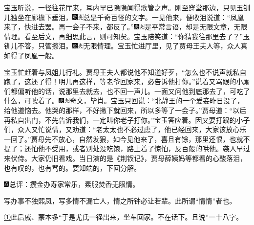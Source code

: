 宝玉听说，一径往花厅来，耳内早已隐隐闻得歌管之声。刚至穿堂那边，只见玉钏儿独坐在廊檐下垂泪，{\includegraphics[width=3mm]{../Images/00004}\includegraphics[width=3mm]{../Images/00012}\footnotesize \kaishu 总是千奇百怪的文字。}一见他来，便收泪说道：``凤凰来了，快进去罢。再一会子不来，都反了。''{\includegraphics[width=3mm]{../Images/00004}\includegraphics[width=3mm]{../Images/00012}\footnotesize \kaishu 是平常言语，却是无限文章，无限情理。看至后文，再细思此言，则可知矣。}宝玉陪笑道：``你猜我往那里去了？''玉钏儿不答，只管擦泪。{\includegraphics[width=3mm]{../Images/00004}\includegraphics[width=3mm]{../Images/00012}\footnotesize \kaishu 无限情理。}宝玉忙进厅里，见了贾母王夫人等，众人真如得了凤凰一般。

宝玉忙赶着与凤姐儿行礼。贾母王夫人都说他不知道好歹，``怎么也不说声就私自跑了，这还了得！明儿再这样，等老爷回家来，必告诉他打你。''说着又骂跟的小厮们都偏听他的话，说那里去就去，也不回一声儿。一面又问他到底那去了，可吃了什么，可唬着了。{\includegraphics[width=3mm]{../Images/00004}\includegraphics[width=3mm]{../Images/00012}\footnotesize \kaishu 奇文，毕肖。}宝玉只回说：``北静王的一个爱妾昨日没了，给他道恼去。他哭的那样，不好撇下就回来，所以多等了一会子。''贾母道：``以后再私自出门，不先告诉我们，一定叫你老子打你。''宝玉答应着。因又要打跟的小子们，众人又忙说情，又劝道：``老太太也不必过虑了，他已经回来，大家该放心乐一回了。''贾母先不放心，自然发狠，如今见他来了，喜且有馀，那里还恨，也就不提了；还怕他不受用，或者别处没吃饱，路上着了惊怕，反百般的哄他。袭人早过来伏侍。大家仍旧看戏。当日演的是《荆钗记》，贾母薛姨妈等都看的心酸落泪，也有叹的，也有骂的。要知端的，下回分解。

{\includegraphics[width=3mm]{../Images/00005}总评：攒金办寿家常乐，素服焚香无限情。}

{写办事不独熙凤，写多情不漏亡人，情之所钟必让若辈。此所谓``情情''者也。}

{\href{../Text/part0047_split_000.html\#navto_1_a}{①}此后戚、蒙本多``于是尤氏一径出来，坐车回家。不在话下。且说''一十八字。}
